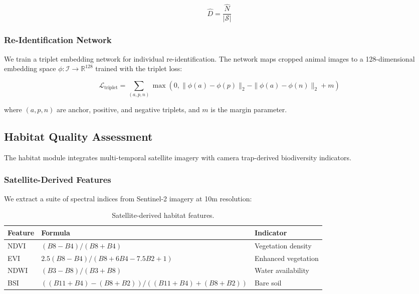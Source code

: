\begin{equation}
\hat{D} = \frac{\hat{N}}{|\mathcal{S}|}
\end{equation}

\subsubsection{Re-Identification Network}

We train a triplet embedding network for individual re-identification. The network maps cropped animal images to a 128-dimensional embedding space $\phi: \mathcal{I} \to \mathbb{R}^{128}$ trained with the triplet loss:

\begin{equation}
\mathcal{L}_{\text{triplet}} = \sum_{(a,p,n)} \max\left(0, \|\phi(a) - \phi(p)\|_2 - \|\phi(a) - \phi(n)\|_2 + m\right)
\end{equation}

where $(a, p, n)$ are anchor, positive, and negative triplets, and $m$ is the margin parameter.

\subsection{Habitat Quality Assessment}

The habitat module integrates multi-temporal satellite imagery with camera trap-derived biodiversity indicators.

\subsubsection{Satellite-Derived Features}

We extract a suite of spectral indices from Sentinel-2 imagery at 10m resolution:

\begin{table}[htbp]
\centering
\caption{Satellite-derived habitat features.}
\label{tab:sat_features}
\begin{tabular}{lll}
\toprule
\textbf{Feature} & \textbf{Formula} & \textbf{Indicator} \\
\midrule
NDVI & $(B8 - B4)/(B8 + B4)$ & Vegetation density \\
EVI & $2.5(B8 - B4)/(B8 + 6B4 - 7.5B2 + 1)$ & Enhanced vegetation \\
NDWI & $(B3 - B8)/(B3 + B8)$ & Water availability \\
BSI & $((B11+B4)-(B8+B2))/((B11+B4)+(B8+B2))$ & Bare soil \\
\bottomrule
\end{tabular}
\end{table}

